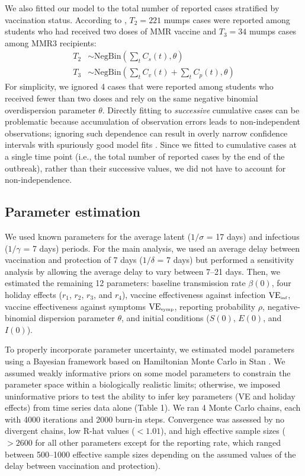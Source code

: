 \documentclass[12pt]{article}
\begin{document}
We also fitted our model to the total number of reported cases stratified by vaccination status.
According to \cite{cardemil2017effectiveness}, $T_2 = 221$ mumps cases were reported among students who had received two doses of MMR vaccine and $T_3 = 34$ mumps cases among MMR3 recipients:
\begin{align}
T_2 &\sim \mathrm{NegBin}\left(\sum_{t} C_s(t), \theta\right)\\
T_3 &\sim \mathrm{NegBin}\left(\sum_{t} C_v(t) + \sum_{t} C_p(t), \theta\right)
\end{align}
For simplicity, we ignored 4 cases that were reported among students who received fewer than two doses and rely on the same negative binomial overdispersion parameter $\theta$.
Directly fitting to \emph{successive} cumulative cases can be problematic because accumulation of observation errors leads to non-independent observations;
ignoring such dependence can result in overly narrow confidence intervals with spuriously good model fits \citep{king2015avoidable}.
Since we fitted to cumulative cases at a single time point (i.e., the total number of reported cases by the end of the outbreak), rather than their successive values, we did not have to account for non-independence.

\subsection{Parameter estimation}

We used known parameters for the average latent ($1/\sigma$ = 17 days) and infectious ($1/\gamma$ = 7 days) periods.
For the main analysis, we used an average delay between vaccination and protection of 7 days ($1/\delta$ = 7 days) but performed a sensitivity analysis by allowing the average delay to vary between 7--21 days.
Then, we estimated the remaining 12 parameters: baseline transmission rate $\beta(0)$, four holiday effects ($r_1$, $r_2$, $r_3$, and $r_4$), vaccine effectiveness against infection $\mathrm{VE}_{\textrm{\tiny{inf}}}$, vaccine effectiveness against symptoms $\mathrm{VE}_{\textrm{\tiny{symp}}}$, reporting probability $\rho$, negative-binomial dispersion parameter $\theta$, and initial conditions ($S(0)$, $E(0)$, and $I(0)$).

To properly incorporate parameter uncertainty, we estimated model parameters using a Bayesian framework based on Hamiltonian Monte Carlo in Stan \citep{carpenter2017stan}.
We assumed weakly informative priors on some model parameters to constrain the parameter space within a biologically realistic limits;
otherwise, we imposed uninformative priors to test the ability to infer key parameters (VE and holiday effects) from time series data alone (Table 1).
We ran 4 Monte Carlo chains, each with 4000 iterations and 2000 burn-in steps.
Convergence was assessed by no divergent chains, low R-hat values ($< 1.01$), and high effective sample sizes ($>2600$ for all other parameters except for the reporting rate, which ranged between 500--1000 effective sample sizes depending on the assumed values of the delay between vaccination and protection).
\end{document}
